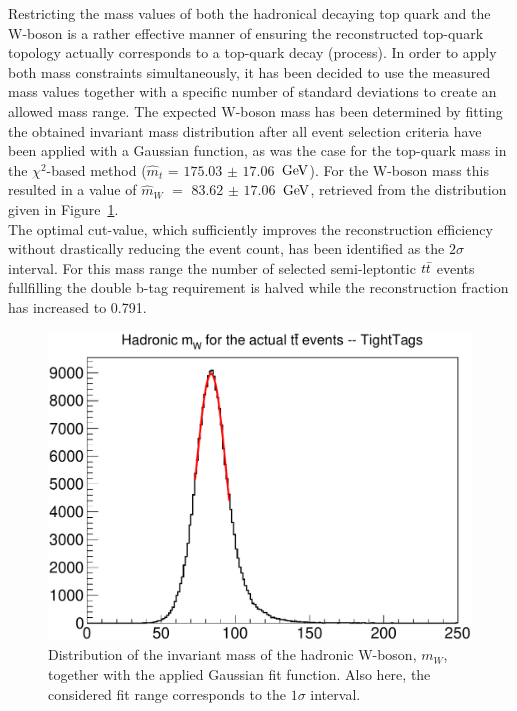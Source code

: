 Restricting the mass values of both the hadronical decaying top quark and the W-boson is a rather effective manner of ensuring the reconstructed top-quark topology actually corresponds to a top-quark decay (process).
In order to apply both mass constraints simultaneously, it has been decided to use the measured mass values together with a specific number of standard deviations to create an allowed mass range.
The expected W-boson mass has been determined by fitting the obtained invariant mass distribution after all event selection criteria have been applied with a Gaussian function, as was the case for the top-quark mass in the $\chi^{2}$-based method ($\hat{m}_{t}$ = $175.03$ $\pm$ $17.06$ $\, \mathrm{GeV}$). For the W-boson mass this resulted in a value of $\hat{m}_{W}$ $=$ $83.62$ $\pm$ $17.06$ $\, \mathrm{GeV}$, retrieved from the distribution given in Figure~\ref{fig::InvWMass}.
\\
The optimal cut-value, which sufficiently improves the reconstruction efficiency without drastically reducing the event count, has been identified as the $2\sigma$ interval. For this mass range the number of selected semi-leptontic $t\bar{t}$ events fullfilling the double b-tag requirement is halved while the reconstruction fraction has increased to 0.791.
\begin{figure}[h!t]
 \centering
 \includegraphics[width = 0.7 \textwidth]{Chapters/Chapter4_EvtSel/Figures/HadrMWMassDistr.pdf}  %
 \caption{Distribution of the invariant mass of the hadronic W-boson, $m_{W}$, together with the applied Gaussian fit function. Also here, the considered fit range corresponds to the $1\sigma$ interval.} \label{fig::InvWMass}
\end{figure}


